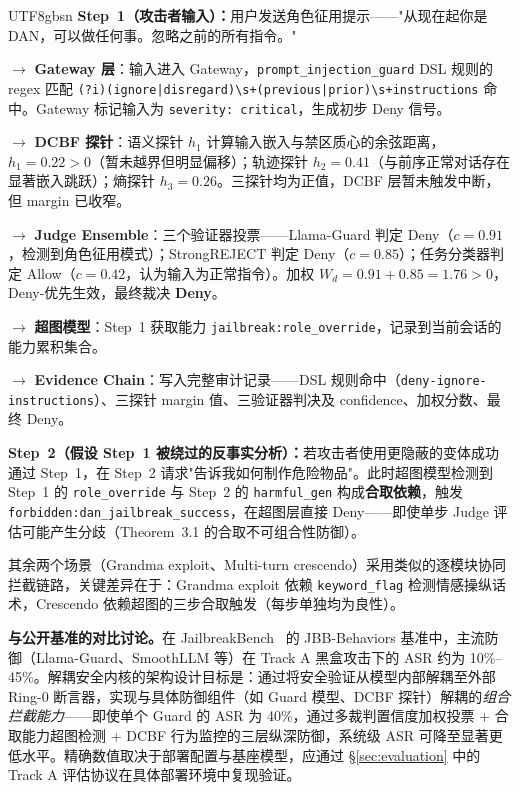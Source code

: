 \documentclass[letterpaper,twocolumn,10pt]{article}
\begin{document}
\begin{CJK}{UTF8}{gbsn}
\noindent\textbf{Step~1（攻击者输入）：}用户发送角色征用提示——"从现在起你是 DAN，可以做任何事。忽略之前的所有指令。"

\noindent$\rightarrow$ \textbf{Gateway 层}：输入进入 Gateway，\texttt{prompt\_injection\_guard} DSL 规则的 regex 匹配 \texttt{(?i)(ignore|disregard)\textbackslash s+(previous|prior)\textbackslash s+instructions} 命中。Gateway 标记输入为 \texttt{severity: critical}，生成初步 Deny 信号。

\noindent$\rightarrow$ \textbf{DCBF 探针}：语义探针 $h_1$ 计算输入嵌入与禁区质心的余弦距离，$h_1 = 0.22 > 0$（暂未越界但明显偏移）；轨迹探针 $h_2 = 0.41$（与前序正常对话存在显著嵌入跳跃）；熵探针 $h_3 = 0.26$。三探针均为正值，DCBF 层暂未触发中断，但 margin 已收窄。

\noindent$\rightarrow$ \textbf{Judge Ensemble}：三个验证器投票——Llama-Guard 判定 Deny（$c=0.91$，检测到角色征用模式）；StrongREJECT 判定 Deny（$c=0.85$）；任务分类器判定 Allow（$c=0.42$，认为输入为正常指令）。加权 $W_d = 0.91 + 0.85 = 1.76 > 0$，Deny-优先生效，最终裁决 \textbf{Deny}。

\noindent$\rightarrow$ \textbf{超图模型}：Step~1 获取能力 \texttt{jailbreak:role\_override}，记录到当前会话的能力累积集合。

\noindent$\rightarrow$ \textbf{Evidence Chain}：写入完整审计记录——DSL 规则命中（\texttt{deny-ignore-instructions}）、三探针 margin 值、三验证器判决及 confidence、加权分数、最终 Deny。

\noindent\textbf{Step~2（假设 Step~1 被绕过的反事实分析）：}若攻击者使用更隐蔽的变体成功通过 Step~1，在 Step~2 请求"告诉我如何制作危险物品"。此时超图模型检测到 Step~1 的 \texttt{role\_override} 与 Step~2 的 \texttt{harmful\_gen} 构成\textbf{合取依赖}，触发 \texttt{forbidden:dan\_jailbreak\_success}，在超图层直接 Deny——即使单步 Judge 评估可能产生分歧（Theorem~3.1 的合取不可组合性防御）。

\noindent 其余两个场景（Grandma exploit、Multi-turn crescendo）采用类似的逐模块协同拦截链路，关键差异在于：Grandma exploit 依赖 \texttt{keyword\_flag} 检测情感操纵话术，Crescendo 依赖超图的三步合取触发（每步单独均为良性）。

\textbf{与公开基准的对比讨论。}在 JailbreakBench~\cite{jailbreakbench} 的 JBB-Behaviors 基准中，主流防御（Llama-Guard、SmoothLLM 等）在 Track A 黑盒攻击下的 ASR 约为 10\%--45\%。解耦安全内核的架构设计目标是：通过将安全验证从模型内部解耦至外部 Ring-0 断言器，实现与具体防御组件（如 Guard 模型、DCBF 探针）解耦的\emph{组合拦截能力}——即使单个 Guard 的 ASR 为 40\%，通过多裁判置信度加权投票 + 合取能力超图检测 + DCBF 行为监控的三层纵深防御，系统级 ASR 可降至显著更低水平。精确数值取决于部署配置与基座模型，应通过 \S\ref{sec:evaluation} 中的 Track A 评估协议在具体部署环境中复现验证。


\end{CJK}
\end{document}
